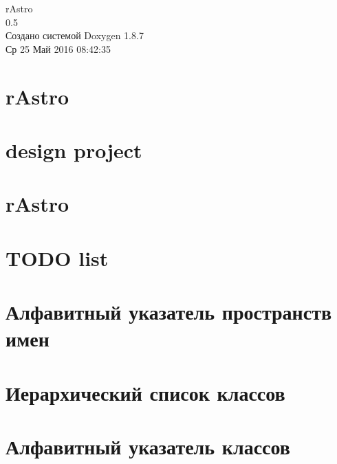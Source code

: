 \documentclass[twoside]{book}
\newcommand{\+}{\discretionary{\mbox{\scriptsize$\hookleftarrow$}}{}{}}
\newcommand{\clearemptydoublepage}{%
  \newpage{\pagestyle{empty}\cleardoublepage}%
}
\begin{document}
\hypersetup{pageanchor=false,
             bookmarks=true,
             bookmarksnumbered=true,
             pdfencoding=unicode
            }
\begin{titlepage}
\vspace*{7cm}
\begin{center}%
{\Large r\+Astro \\[1ex]\large 0.\+5 }\\
\vspace*{1cm}
{\large Создано системой Doxygen 1.8.7}\\
\vspace*{0.5cm}
{\small Ср 25 Май 2016 08:42:35}\\
\end{center}
\end{titlepage}
\clearemptydoublepage
\tableofcontents
\clearemptydoublepage
{}
\hypersetup{pageanchor=true}

\chapter{r\+Astro}
\label{index}\hypertarget{index}{}
\chapter{design project}
\label{md_design_project}
\hypertarget{md_design_project}{}

\chapter{r\+Astro}
\label{md__r_e_a_d_m_e}
\hypertarget{md__r_e_a_d_m_e}{}

\chapter{T\+O\+D\+O list}
\label{md__t_o_d_o}
\hypertarget{md__t_o_d_o}{}

\chapter{Алфавитный указатель пространств имен}

\chapter{Иерархический список классов}

\chapter{Алфавитный указатель классов}

\end{document}
